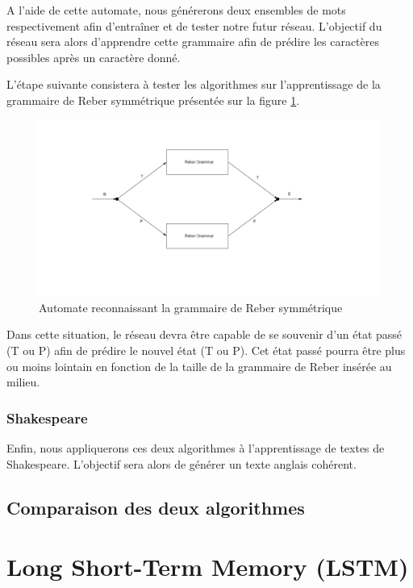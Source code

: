 \documentclass{report}
\theoremstyle{plain}
\theoremstyle{definition}
\theoremstyle{remark}
\begin{document}
A l'aide de cette automate, nous générerons deux ensembles de mots respectivement afin d'entraîner et de tester notre futur réseau. L'objectif du réseau sera alors d'apprendre cette grammaire afin de prédire les caractères possibles après un caractère donné.

L'étape suivante consistera à tester les algorithmes sur l'apprentissage de la grammaire de Reber symmétrique présentée sur la figure \ref{Grammaire de Reber symmétrique}.  
\begin{figure}[h!]
\begin{center}
\includegraphics[scale=0.5]{images/reber_symmetrique.png}
\caption{Automate reconnaissant la grammaire de Reber symmétrique}
\label{Grammaire de Reber symmétrique}
\end{center}
\end{figure}

Dans cette situation, le réseau devra être capable de se souvenir d'un état passé (T ou P) afin de prédire le nouvel état (T ou P). Cet état passé pourra être plus ou moins lointain en fonction de la taille de la grammaire de Reber insérée au milieu. 
\bigbreak
\bigbreak

\subsection{Shakespeare}

Enfin, nous appliquerons ces deux algorithmes à l'apprentissage de textes de Shakespeare. L'objectif sera alors de générer un texte anglais cohérent.

\section{Comparaison des deux algorithmes}

\chapter{Long Short-Term Memory (LSTM)}
\end{document}
